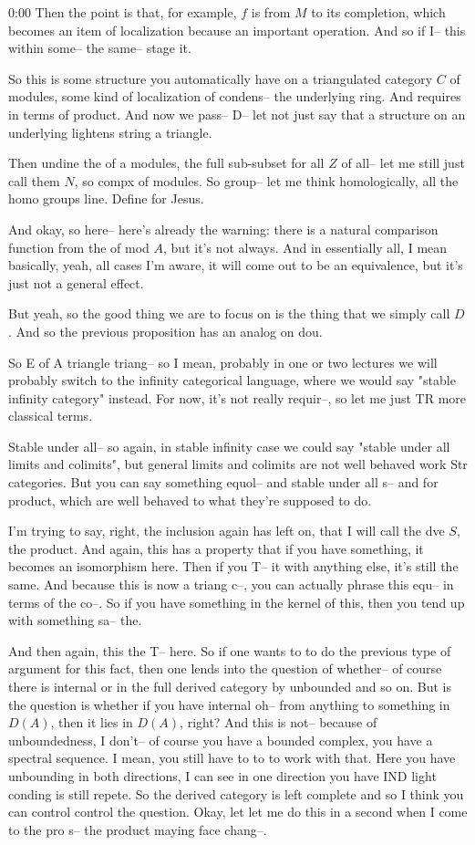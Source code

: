 \begin{unfinished}{0:00}
Then the point is that, for example, $f$ is from $M$ to its completion, which becomes an item of localization because an important operation. And so if I-- this within some-- the same-- stage it.

So this is some structure you automatically have on a triangulated category $C$ of modules, some kind of localization of condens-- the underlying ring. And requires in terms of product. And now we pass-- D-- let not just say that a structure on an underlying lightens string a triangle.

Then undine the of a modules, the full sub-subset for all $Z$ of all-- let me still just call them $N$, so compx of modules. So group-- let me think homologically, all the homo groups line. Define for Jesus.

And okay, so here-- here's already the warning: there is a natural comparison function from the of mod $A$, but it's not always. And in essentially all, I mean basically, yeah, all cases I'm aware, it will come out to be an equivalence, but it's just not a general effect.

But yeah, so the good thing we are to focus on is the thing that we simply call $D$. And so the previous proposition has an analog on dou.

So E of A triangle triang-- so I mean, probably in one or two lectures we will probably switch to the infinity categorical language, where we would say "stable infinity category" instead. For now, it's not really requir--, so let me just TR more classical terms.

Stable under all-- so again, in stable infinity case we could say "stable under all limits and colimits", but general limits and colimits are not well behaved work Str categories. But you can say something equol-- and stable under all s-- and for product, which are well behaved to what they're supposed to do.

I'm trying to say, right, the inclusion again has left on, that I will call the dve $S$, the product. And again, this has a property that if you have something, it becomes an isomorphism here. Then if you T-- it with anything else, it's still the same. And because this is now a triang c--, you can actually phrase this equ-- in terms of the co--. So if you have something in the kernel of this, then you tend up with something sa-- the.

And then again, this the T-- here. So if one wants to to do the previous type of argument for this fact, then one lends into the question of whether-- of course there is internal or in the full derived category by unbounded and so on. But is the question is whether if you have internal oh-- from anything to something in $D(A)$, then it lies in $D(A)$, right? And this is not-- because of unboundedness, I don't-- of course you have a bounded complex, you have a spectral sequence. I mean, you still have to to to work with that. Here you have unbounding in both directions, I can see in one direction you have IND light conding is still repete. So the derived category is left complete and so I think you can control control the question. Okay, let let me do this in a second when I come to the pro s-- the product maying face chang--.


\end{unfinished}
